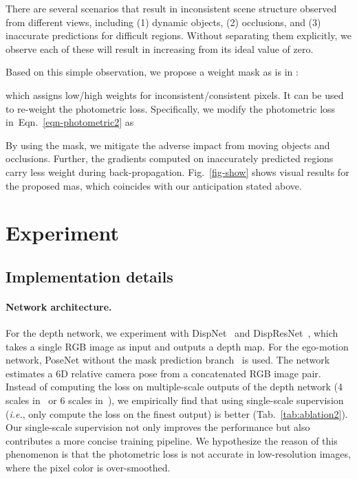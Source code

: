 \documentclass{article}
\newcommand{\figref}[1]{Fig.~\ref{#1}}
\newcommand{\tabref}[1]{Tab.~\ref{#1}}
\newcommand{\equref}[1]{Eqn.~\ref{#1}}
\def\ie{\emph{i.e.}}
\begin{document}
There are several scenarios that result in inconsistent scene structure observed from different views, including (1) dynamic objects, (2) occlusions, and (3) inaccurate predictions for difficult regions.
Without separating them explicitly, we observe each of these will result in  increasing from its ideal value of zero.

Based on this simple observation, we propose a weight mask  as  is in :

which assigns low/high weights for inconsistent/consistent pixels. It can be used to re-weight the photometric loss.
Specifically, we modify the photometric loss in~\equref{eqn-photometric2} as



By using the mask, we mitigate the adverse impact from moving objects and occlusions.
Further, the gradients computed on inaccurately predicted regions carry less weight during back-propagation.
\figref{fig-show} shows visual results for the proposed mas, which coincides with our anticipation stated above.



\section{Experiment}
\subsection{Implementation details}\label{sec-details}

\paragraph{Network architecture.}
For the depth network, we experiment with DispNet~\cite{zhou2017unsupervised} and DispResNet~\cite{ranjan2019cc}, which takes a single RGB image as input and outputs a depth map.
For the ego-motion network, PoseNet without the mask prediction branch~\cite{zhou2017unsupervised} is used. 
The network estimates a 6D relative camera pose from a concatenated RGB image pair.
Instead of computing the loss on multiple-scale outputs of the depth network (4 scales in~\cite{zhou2017unsupervised} or 6 scales in~\cite{ranjan2019cc}),
we empirically find that using single-scale supervision (\ie, only compute the loss on the finest output) is better (\tabref{tab:ablation2}).
Our single-scale supervision not only improves the performance but also contributes a more concise training pipeline.
We hypothesize the reason of this phenomenon is that the photometric loss is not accurate in low-resolution images, where the pixel color is over-smoothed.
\end{document}

